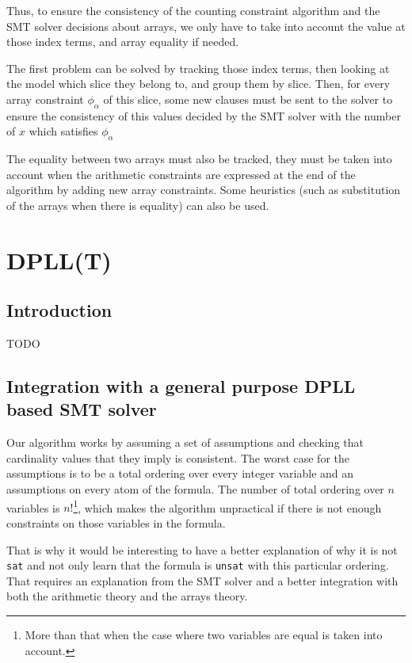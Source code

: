 \documentclass[]{article}
\begin{document}
Thus, to ensure the consistency of the counting constraint algorithm and
the SMT solver decisions about arrays, we only have to take into account
the value at those index terms, and array equality if needed.

The first problem can be solved by tracking those index terms, then
looking at the model which slice they belong to, and group them by
slice. Then, for every array constraint $\phi_\alpha$ of this slice,
some new clauses must be sent to the solver to ensure the consistency of
this values decided by the SMT solver with the number of $x$ which
satisfies $\phi_\alpha$

The equality between two arrays must also be tracked, they must be taken
into account when the arithmetic constraints are expressed at the end of
the algorithm by adding new array constraints. Some heuristics (such as
substitution of the arrays when there is equality) can also be used.

\section{DPLL(T)}\label{dpllt}

\subsection{Introduction}\label{introduction-1}

TODO

\subsection{Integration with a general purpose DPLL based SMT
solver}\label{integration-with-a-general-purpose-dpll-based-smt-solver}

Our algorithm works by assuming a set of assumptions and checking that
cardinality values that they imply is consistent. The worst case for the
assumptions is to be a total ordering over every integer variable and an
assumptions on every atom of the formula. The number of total ordering
over $n$ variables is
$n!$\footnote{More than that when the case where two variables are equal is taken into account.},
which makes the algorithm unpractical if there is not enough constraints
on those variables in the formula.

That is why it would be interesting to have a better explanation of why
it is not \texttt{sat} and not only learn that the formula is
\texttt{unsat} with this particular ordering. That requires an
explanation from the SMT solver and a better integration with both the
arithmetic theory and the arrays theory.
\end{document}
